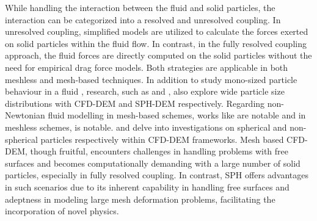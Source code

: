 \documentclass[preprint,12pt]{elsarticle}
\begin{document}
While handling the interaction between the fluid and solid particles, the
interaction can be categorized into a resolved and unresolved coupling.  In
unresolved coupling, simplified models are utilized to calculate the forces
exerted on solid particles within the fluid flow. In contrast, in the fully
resolved coupling approach, the fluid forces are directly computed on the
solid particles without the need for empirical drag force models.  Both
strategies are applicable in both meshless \cite{cleary2015prediction,
  trujillo2020smooth} and mesh-based \cite{van2008numerical, ma2022review}
techniques.  In addition to study mono-sized particle behaviour in a fluid
\cite{trujillo2020smooth}, research, such as \cite{brosh2014accelerating} and
\cite{peng2021fully}, also explore wide particle size distributions with
CFD-DEM and SPH-DEM respectively.  Regarding non-Newtonian fluid modelling in
mesh-based schemes, works like \cite{li2018dam} are notable and in meshless
schemes, \cite{peng2021fully} is notable. \citet{zhu2008discrete} and
\citet{ma2022review} delve into investigations on spherical and non-spherical
particles respectively within CFD-DEM frameworks.  Mesh based CFD-DEM, though
fruitful, encounters challenges in handling problems with free surfaces and
becomes computationally demanding with a large number of solid particles,
especially in fully resolved coupling. In contrast, SPH offers advantages in
such scenarios due to its inherent capability in handling free surfaces and
adeptness in modeling large mesh deformation problems, facilitating the
incorporation of novel physics.
\end{document}

